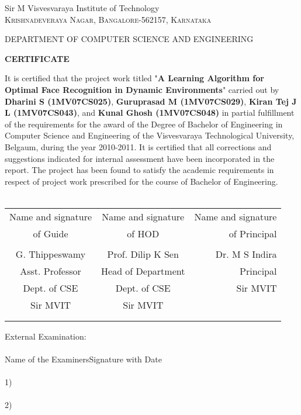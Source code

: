 \newcommand{\tabcer}{\hspace*{1.5 cm}}
%
\begin {center}
\LARGE{Sir M Visvesvaraya Institute of Technology }\\
\normalsize
\textsc{Krishnadeveraya Nagar, Bangalore-562157, Karnataka\\ }


DEPARTMENT OF COMPUTER SCIENCE  AND  ENGINEERING 

\vspace*{10.3mm}


								\textup{\Large \textbf{CERTIFICATE}} 
								
								
\end{center} 								
\vspace*{10.3mm}
It is certified that the project work titled "\textbf{A Learning Algorithm for Optimal Face Recognition in Dynamic Environments}" carried out by \textbf{Dharini S (1MV07CS025)}, \textbf{Guruprasad M (1MV07CS029)}, \textbf{Kiran Tej J L (1MV07CS043)}, and \textbf{Kunal Ghosh (1MV07CS048)} in partial fulfillment of the requirements for the award of the Degree of Bachelor of Engineering in Computer Science and Engineering of the Visvesvaraya Technological University, Belgaum, during the year 2010-2011. It is certified that all corrections and suggestions indicated for internal assessment have been incorporated in the report. The project has been found to satisfy the academic requirements in respect of project work prescribed for the course of Bachelor of Engineering. \\ \\


\begin{table}[h]
\begin{tabular}{c c r} \\
Name and signature \tabcer & Name and signature \tabcer  & Name and signature  \\
of Guide   \tabcer &   of HOD             \tabcer & \tabcer of Principal \\
\\ 
G. Thippeswamy \tabcer & Prof. Dilip K Sen \tabcer & Dr. M S Indira \\
Asst. Professor \tabcer & Head of Department \tabcer & Principal \\
Dept. of CSE	\tabcer & Dept. of CSE \tabcer &	Sir MVIT \\
Sir MVIT \tabcer & Sir MVIT \tabcer \\ \\ \\ 
\end{tabular}
\end{table}
External Examination: \\ \\
Name of the Examiners\tabcer \tabcer \tabcer \tabcer \tabcer  Signature with Date \\ \\

1) \\ \\

2)

%